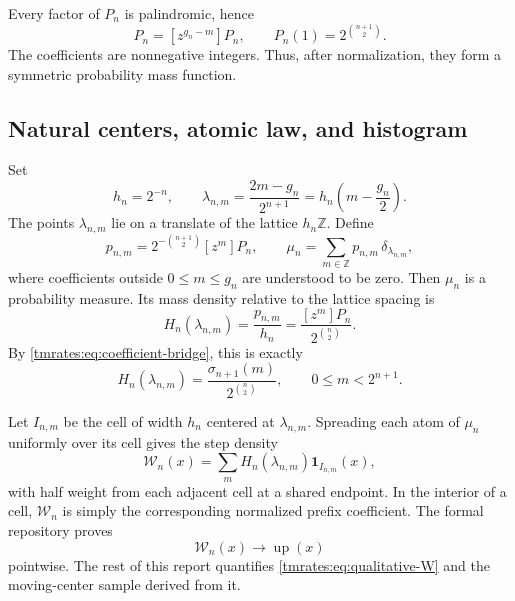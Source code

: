 \documentclass[11pt,oneside]{article}
\theoremstyle{definition}
\theoremstyle{remark}
\newcommand{\Z}{\mathbb Z}
\newcommand{\Up}{\operatorname{up}}
\begin{document}
Every factor of $P_n$ is palindromic, hence
\begin{equation}
 [z^m]P_n=[z^{g_n-m}]P_n,
 \qquad
 P_n(1)=2^{\binom{n+1}{2}}.                               \label{tmrates:eq:Pn-symmetry-mass}
\end{equation}
The coefficients are nonnegative integers.  Thus, after normalization, they form a symmetric
probability mass function.

\subsection{Natural centers, atomic law, and histogram}

Set
\begin{equation}
 h_n=2^{-n},
 \qquad
 \lambda_{n,m}=\frac{2m-g_n}{2^{n+1}}
 =h_n\left(m-\frac{g_n}{2}\right).                        \label{tmrates:eq:center}
\end{equation}
The points $\lambda_{n,m}$ lie on a translate of the lattice $h_n\Z$.  Define
\begin{equation}
 p_{n,m}=2^{-\binom{n+1}{2}}[z^m]P_n,
 \qquad
 \mu_n=\sum_{m\in\Z}p_{n,m}\,\delta_{\lambda_{n,m}},    \label{tmrates:eq:atomic-law}
\end{equation}
where coefficients outside $0\le m\le g_n$ are understood to be zero.  Then $\mu_n$ is a
probability measure.  Its mass density relative to the lattice spacing is
\begin{equation}
 H_n(\lambda_{n,m})=\frac{p_{n,m}}{h_n}
 =\frac{[z^m]P_n}{2^{\binom n2}}.                          \label{tmrates:eq:Hn}
\end{equation}
By \eqref{tmrates:eq:coefficient-bridge}, this is exactly
\begin{equation}
 H_n(\lambda_{n,m})
 =\frac{\sigma_{n+1}(m)}{2^{\binom n2}},
 \qquad 0\le m<2^{n+1}.                                  \label{tmrates:eq:Hn-prefix}
\end{equation}

Let $I_{n,m}$ be the cell of width $h_n$ centered at $\lambda_{n,m}$.  Spreading each atom of
$\mu_n$ uniformly over its cell gives the step density
\begin{equation}
 \mathcal W_n(x)=\sum_m H_n(\lambda_{n,m})\mathbf 1_{I_{n,m}}(x), \label{tmrates:eq:Wn}
\end{equation}
with half weight from each adjacent cell at a shared endpoint.  In the interior of a cell,
$\mathcal W_n$ is simply the corresponding normalized prefix coefficient.  The formal
repository proves
\begin{equation}
 \mathcal W_n(x)\longrightarrow\Up(x)                     \label{tmrates:eq:qualitative-W}
\end{equation}
pointwise.  The rest of this report quantifies \eqref{tmrates:eq:qualitative-W} and the moving-center
sample derived from it.
\end{document}
